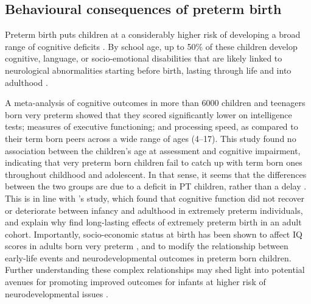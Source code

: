 


\subsection{Behavioural consequences of preterm birth}

Preterm birth puts children at a considerably higher risk of developing a broad range of cognitive deficits \citep{Brydges2018}. %
By school age, up to 50\% of these children develop cognitive, language, or socio-emotional disabilities that are likely linked to neurological abnormalities starting before birth, lasting through life and into adulthood \citep{Gozzo2009, Chaminade2013, Moiseev2014, Hornman2016, Thomason2017, Burnett2018}.

A meta-analysis of cognitive outcomes in more than 6000 children and teenagers born very preterm \citep{Brydges2018} showed that they scored significantly lower on intelligence tests; measures of executive functioning; and processing speed, as compared to their term born peers across a wide range of ages (4--17). This study found no association between the children's age at assessment and cognitive impairment, indicating that very preterm born children fail to catch up with term born ones throughout childhood and adolescent. In that sense, it seems that the differences between the two groups are due to a deficit in PT children, rather than a delay \citep{Brydges2018}. This is in line with \citep{Linsell2018}'s study, which found that cognitive function did not recover or deteriorate between infancy and adulthood in extremely preterm individuals, and explain why \citep{Doyle2010} find long-lasting effects of extremely preterm birth in an adult cohort. Importantly, socio-economic status at birth has been shown to affect IQ scores in adults born very preterm \citep{Breeman2017}, and to modify the relationship between early-life events and neurodevelopmental outcomes in preterm born children. Further understanding these complex relationships may shed light into potential avenues for promoting improved outcomes for infants at higher risk of neurodevelopmental issues \citep{Benavente-Fernandez2020}. 

